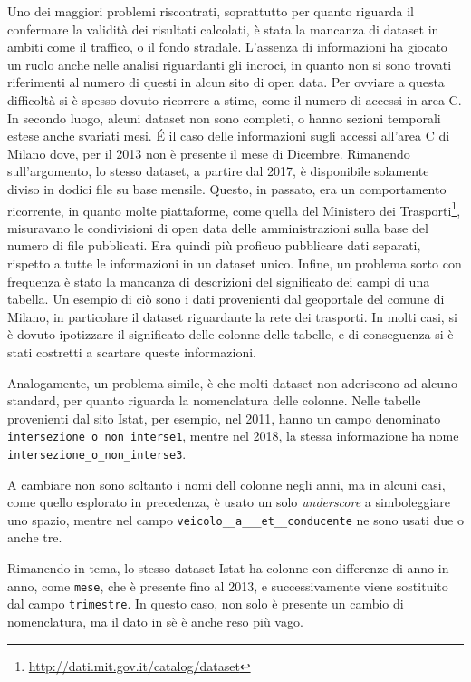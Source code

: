 \documentclass[a4paper,12pt]{report}
\newcommand{\columnstyle}[1]{\texttt{#1}}
\newcommand{\quotestyle}[1]{\textit{#1}}
\newcommand{\skipline}{\vspace{0.2in}}
\begin{document}
Uno dei maggiori problemi riscontrati, soprattutto per quanto riguarda il confermare la 
validità dei risultati calcolati, è stata la mancanza di dataset in ambiti come il traffico, 
o il fondo stradale. 
L'assenza di informazioni ha giocato un ruolo anche nelle analisi riguardanti gli incroci, 
in quanto non si sono trovati riferimenti al numero di questi in alcun sito di open data.
Per ovviare a questa difficoltà si è spesso dovuto ricorrere a stime, 
come il numero di accessi in area C. 
\skipline
In secondo luogo, alcuni dataset non sono completi, o hanno sezioni temporali 
estese anche svariati mesi. 
\'E il caso delle informazioni sugli accessi all'area C di Milano dove, 
per il 2013 non è presente il mese di Dicembre.
Rimanendo sull'argomento, lo stesso dataset, a partire dal 2017, è disponibile 
solamente diviso in dodici file su base mensile.
Questo, in passato, era un comportamento ricorrente, in 
quanto molte piattaforme, come quella del Ministero dei 
Trasporti\footnote{\url{http://dati.mit.gov.it/catalog/dataset}}, 
misuravano le condivisioni di open data delle amministrazioni 
sulla base del numero di file pubblicati. 
Era quindi più proficuo pubblicare dati separati, rispetto a tutte le informazioni in 
un dataset unico.
\skipline
Infine, un problema sorto con frequenza è stato la mancanza di descrizioni del 
significato dei campi di una tabella. 
Un esempio di ciò sono i dati provenienti dal geoportale del comune di Milano, 
in particolare il dataset riguardante la rete dei trasporti.
In molti casi, si è dovuto ipotizzare il significato delle colonne delle tabelle, 
e di conseguenza si è stati costretti a scartare queste informazioni. 

Analogamente, un problema simile, è che molti dataset non aderiscono ad 
alcuno standard, per quanto riguarda la nomenclatura delle colonne.
Nelle tabelle provenienti dal sito Istat, per esempio, nel 2011, hanno un campo denominato 
\columnstyle{intersezione\_o\_non\_interse1}, mentre nel 2018, la stessa informazione ha 
nome \columnstyle{intersezione\_o\_non\_interse3}. 

A cambiare non sono soltanto i nomi dell colonne negli anni, ma in alcuni casi, 
come quello esplorato in precedenza, è usato un solo \quotestyle{underscore} a 
simboleggiare uno spazio, mentre nel campo \columnstyle{veicolo\_\_a\_\_\_et\_\_conducente} 
ne sono usati due o anche tre.

Rimanendo in tema, lo stesso dataset Istat ha colonne con differenze di anno in anno, 
come \columnstyle{mese}, che è presente fino al 2013, e successivamente viene 
sostituito dal campo \columnstyle{trimestre}. 
In questo caso, non solo è presente un cambio di nomenclatura, ma il dato in sè è 
anche reso più vago.
\end{document}
